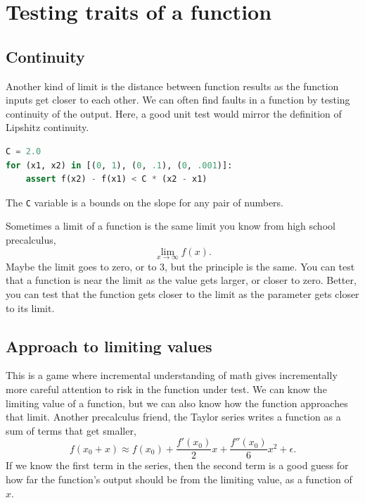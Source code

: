 \documentclass[fleqn,10pt]{olplainarticle}
\begin{document}
\section{Testing traits of a function}

\subsection{Continuity}

Another kind of limit is the distance between function results
as the function inputs get closer to each other. We can often
find faults in a function by testing continuity of the output.
Here, a good unit test would mirror the definition of Lipshitz continuity.
\begin{lstlisting}[language=python]
C = 2.0
for (x1, x2) in [(0, 1), (0, .1), (0, .001)]:
    assert f(x2) - f(x1) < C * (x2 - x1)
\end{lstlisting}
The \lstinline!C! variable is a bounds on the slope for any
pair of numbers.

Sometimes a limit of a function is the same limit you know
from high school precalculus,
\begin{equation}
  \lim_{x\rightarrow\infty} f(x).
\end{equation}
Maybe the limit goes to zero, or to 3, but the principle is
the same. You can test that a function is near the limit
as the value gets larger, or closer to zero. Better, you can
test that the function gets closer to the limit as the
parameter gets closer to its limit.

\subsection{Approach to limiting values}

This is a game where incremental understanding of math
gives incrementally more careful attention to risk in the
function under test. We can know the limiting value of a
function, but we can also know how the function approaches
that limit. Another precalculus friend, the Taylor series
writes a function as a sum of terms that get smaller,
\begin{equation}
  f(x_0+x) \approx f(x_0) + \frac{f'(x_0)}{2}x + \frac{f''(x_0)}{6}x^2 + \epsilon.
\end{equation}
If we know the first term in the series, then the second term
is a good guess for how far the function's output should be from
the limiting value, as a function of $x$.
\end{document}
